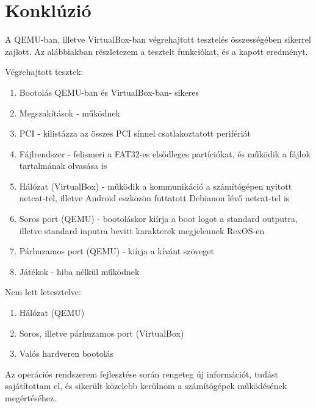 \documentclass[12pt,numbers=noenddot]{report}
\begin{document}
\chapter{Konklúzió}

A QEMU-ban, illetve VirtualBox-ban végrehajtott tesztelés összességében sikerrel
zajlott. Az alábbiakban részletezem a tesztelt funkciókat, és a kapott
eredményt.

\hfill \break
Végrehajtott tesztek:

\begin{enumerate}
	\item Bootolás QEMU-ban és VirtualBox-ban- sikeres
	\item Megszakítások - működnek
	\item PCI - kilistázza az összes PCI sínnel csatlakoztatott perifériát
	\item Fájlrendszer - felismeri a FAT32-es elsődleges partíciókat, és
	működik a fájlok tartalmának olvasása is
	\item Hálózat (VirtualBox) - működik a kommunikáció a számítógépen nyitott
	netcat-tel, illetve Android eszközön futtatott Debianon lévő netcat-tel is
	\item Soros port (QEMU) - bootoláskor kiírja a boot logot a standard
	outputra, illetve standard inputra bevitt karakterek megjelennek RexOS-en
	\item Párhuzamos port (QEMU) - kiírja a kívánt szöveget
	\item Játékok - hiba nélkül működnek
\end{enumerate}

\noindent Nem lett letesztelve:

\begin{enumerate}
	\item Hálózat (QEMU)
	\item Soros, illetve párhuzamos port (VirtualBox)
	\item Valós hardveren bootolás
\end{enumerate}

\noindent Az operációs rendszerem fejlesztése során rengeteg új információt,
tudást sajátítottam el, és sikerült közelebb kerülnöm a számítógépek működésének
megértéséhez.


\clearpage
{}
{}
\end{document}
